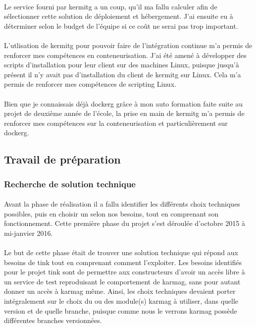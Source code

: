 \documentclass[12pt,a4paper]{report}
\begin{document}
\paragraph*{}Le service fourni par \gls{kermitg} a un coup, qu'il ma fallu calculer afin de sélectionner cette solution de déploiement et hébergement. J'ai ensuite eu à déterminer selon le budget de l'équipe si ce coût ne serai pas trop important. 
\paragraph*{}L'utlisation de \gls{kermitg} pour pouvoir faire de l'intégration continue m'a permis de renforcer mes compétences en conteneurisation. J’ai été amené à
développer des scripts d’installation pour leur client sur des machines Linux, puisque
jusqu’à présent il n’y avait pas d’installation du client de \gls{kermitg} sur Linux. Cela m’a permis de renforcer mes compétences de scripting Linux.
\paragraph*{}Bien que je connaissais déjà \gls{dockerg} grâce à mon auto formation faite suite au projet de deuxième année de l’école, la prise en main de \gls{kermitg} m’a permis de renforcer mes compétences sur la conteneurisation et particulièrement sur \gls{dockerg}. \\
\subsection{Travail de préparation} 
\subsubsection{Recherche de solution technique}
\paragraph*{}Avant la phase de réalisation il a fallu identifier les différents choix techniques possibles, puis en choisir un selon nos besoins, tout en comprenant son fonctionnement. Cette première phase du projet s’est déroulée d’octobre 2015 à mi-janvier 2016.
\paragraph*{}Le but de cette phase était de trouver une solution technique qui répond
aux besoins de \gls{tink} tout en comprenant comment l’exploiter. Les besoins identifiés pour le projet \gls{tink} sont de permettre aux constructeurs d’avoir un accès libre à un service de test reproduisant le comportement de \gls{karmag}, sans pour autant donner un accès à \gls{karmag} même. Ainsi, les choix techniques devaient porter intégralement sur le choix du ou des module(s) \gls{karmag} à utiliser, dans quelle version et de quelle branche, puisque comme nous le verrons \gls{karmag} possède différentes branches versionnées.
\end{document}
